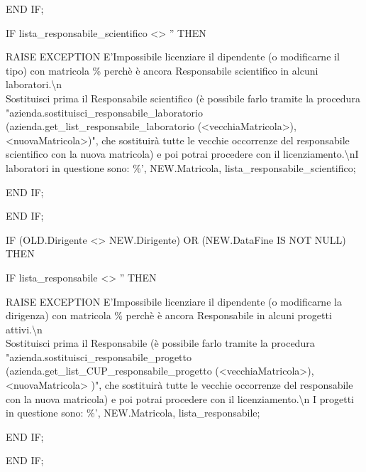 \begin{flushleft}
\begin{description}
\begin{description}
\begin{description}
\begin{description}
                            \end{description}
                            \item END IF;

                            \item IF lista\_responsabile\_scientifico <> '' THEN
                            \begin{description}
                                \item RAISE EXCEPTION E'Impossibile licenziare il dipendente (o modificarne il tipo) con matricola \% perchè è ancora Responsabile scientifico in alcuni laboratori.\textbackslash{n}\\Sostituisci prima il Responsabile scientifico (è possibile farlo tramite la procedura "azienda.sostituisci\_responsabile\_laboratorio (azienda.get\_list\_responsabile\_laboratorio (<vecchiaMatricola>), <nuovaMatricola>)", che sostituirà tutte le vecchie occorrenze del responsabile scientifico con la nuova matricola) e poi potrai procedere con il licenziamento.\textbackslash{n}I laboratori in questione sono: \%', NEW.Matricola, lista\_responsabile\_scientifico;
                            \end{description}
                            \item END IF;
                        \end{description}
                        \item END IF;

                        \vspace{0.5cm}

                        \item IF (OLD.Dirigente <> NEW.Dirigente) OR (NEW.DataFine IS NOT NULL) THEN
                        \begin{description}
                            \item IF lista\_responsabile <> '' THEN
                            \begin{description}
                                \item RAISE EXCEPTION E'Impossibile licenziare il dipendente (o modificarne la dirigenza) con matricola \% perchè è ancora Responsabile in alcuni progetti attivi.\textbackslash{n} \\Sostituisci prima il Responsabile (è possibile farlo tramite la procedura "azienda.sostituisci\_responsabile\_progetto (azienda.get\_list\_CUP\_responsabile\_progetto (<vecchiaMatricola>), <nuovaMatricola> )", che sostituirà tutte le vecchie occorrenze del responsabile con la nuova matricola) e poi potrai procedere con il licenziamento.\textbackslash{n} I progetti in questione sono: \%', NEW.Matricola, lista\_responsabile;
                            \end{description}
                            \item END IF;
                        \end{description}
                        \item END IF;
                        

\end{description}
\end{description}
\end{flushleft}
